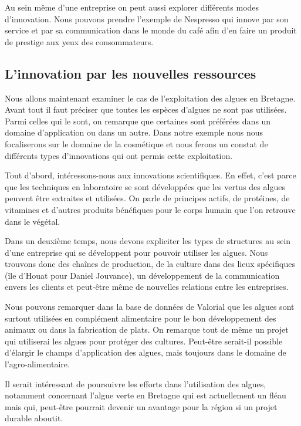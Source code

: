 \documentclass[a4paper,12pt]{report}
\begin{document}
			Au sein même d’une entreprise on peut aussi explorer différents modes d’innovation. Nous pouvons prendre l’exemple de Nespresso qui innove par son service et par sa communication dans le monde du café afin d’en faire un produit de prestige aux yeux des consommateurs.
				
		\subsection{L'innovation par les nouvelles ressources}
			Nous allons maintenant examiner le cas de l’exploitation des algues en Bretagne.
			Avant tout il faut préciser que toutes les espèces d’algues ne sont pas utilisées. Parmi celles qui le sont, on remarque que certaines sont préférées dans un domaine d’application ou dans un autre. Dans notre exemple nous nous focaliserons sur le domaine de la cosmétique et nous ferons un constat de différents types d’innovations qui ont permis cette exploitation.
			
			Tout d’abord, intéressons-nous aux innovations scientifiques. En effet, c’est parce que les techniques en laboratoire se sont développées que les vertus des algues peuvent être extraites et utilisées. On parle de principes actifs, de protéines, de vitamines et d’autres produits bénéfiques pour le corps humain que l’on retrouve dans le végétal.
			
			Dans un deuxième temps, nous devons expliciter les types de structures au sein d’une entreprise qui se développent pour pouvoir utiliser les algues. Nous trouvons donc des chaînes de production, de la culture dans des lieux spécifiques (île d’Houat pour Daniel Jouvance)\cite{Algues}, un développement de la communication envers les clients et peut-être même de nouvelles relations entre les entreprises.
			
			Nous pouvons remarquer dans la base de données de Valorial que les algues sont surtout utilisées en complément alimentaire pour le bon développement des animaux ou dans la fabrication de plats. On remarque tout de même un projet qui utiliserai les algues pour protéger des cultures. Peut-être serait-il possible d’élargir le champs d’application des algues, mais toujours dans le domaine de l’agro-alimentaire. 
			
			Il serait intéressant de poursuivre les efforts dans l’utilisation des algues, notamment concernant l’algue verte en Bretagne qui est actuellement un fléau mais qui, peut-être pourrait devenir un avantage pour la région si un projet durable aboutit. 
			
\end{document}

